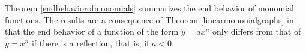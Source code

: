 \documentclass{ximera}
\begin{document}
\begin{center}
\end{center}





Theorem \ref{endbehaviorofmonomials} summarizes the end behavior of monomial functions.  The results are a consequence of Theorem \ref{linearmononialgraphs} in that the end behavior of a function of the form $y = ax^n$  only differs from that of  $y = x^n$ if there is a reflection, that is, if $a<0$.    



\end{document}

